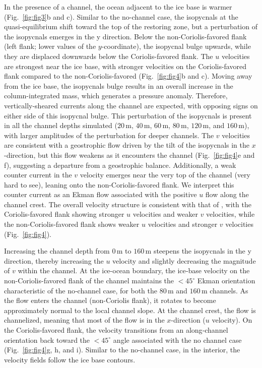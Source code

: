 \documentclass[draft]{agujournal2019}
\begin{document}
In the presence of a channel, the ocean adjacent to the ice base is warmer (Fig.~\ref{fig:fig3}b and c). Similar to the no-channel case, the isopycnals at the quasi-equilibrium shift toward the top of the restoring zone, but a perturbation of the isopycnals emerges in the y direction. Below the non-Coriolis-favored flank (left flank; lower values of the $y$-coordinate), the isopycnal bulge upwards, while they are displaced downwards below the Coriolis-favored flank. The $u$ velocities are strongest near the ice base, with stronger velocities on the Coriolis-favored flank compared to the non-Coriolis-favored (Fig.~\ref{fig:fig4}b and c). Moving away from the ice base, the isopycnals bulge results in an overall increase in the column-integrated mass, which generates a pressure anomaly. Therefore, vertically-sheared currents along the channel are expected, with opposing signs on either side of this isopycnal bulge. This perturbation of the isopycnals is present in all the channel depths simulated ($20\,\mathrm{m}$, $40\,\mathrm{m}$, $60\,\mathrm{m}$, $80\,\mathrm{m}$, $120\,\mathrm{m}$, and $160\,\mathrm{m}$), with larger amplitudes of the perturbation for deeper channels.
The $v$ velocities are consistent with a geostrophic flow driven by the tilt of the isopycnals in the $x$-direction, but this flow weakens as it encounters the channel (Fig.~\ref{fig:fig4}e and f), suggesting a departure from a geostrophic balance. Additionally, a weak counter current in the $v$ velocity emerges near the very top of the channel (very hard to see), leaning onto the non-Coriolis-favored flank. We interpret this counter current as an Ekman flow associated with the positive $u$ flow along the channel crest.
The overall velocity structure is consistent with that of \citet{Cheng_Channel_2024}, with the Coriolis-favored flank showing stronger $u$ velocities and weaker $v$ velocities, while the non-Coriolis-favored flank shows weaker $u$ velocities and stronger $v$ velocities (Fig.~\ref{fig:fig4}). 

Increasing the channel depth from $0\,\mathrm{m}$ to $160\,\mathrm{m}$ steepens the isopycnals in the y direction, thereby increasing the $u$ velocity and slightly decreasing the magnitude of $v$ within the channel. At the ice-ocean boundary, the ice‑base velocity on the non-Coriolis-favored flank of the channel maintains the $< 45^\circ$ Ekman orientation characteristic of the no‑channel case, for both the $80\,\mathrm{m}$ and $160\,\mathrm{m}$ channels. As the flow enters the channel (non-Coriolis flank), it rotates to become approximately normal to the local channel slope. At the channel crest, the flow is channelized, meaning that most of the flow is in the $x$-direction ($u$ velocity). On the Coriolis-favored flank, the velocity transitions from an along‑channel orientation back toward the $< 45^\circ$ angle associated with the no channel case (Fig.~\ref{fig:fig4}g, h, and i). Similar to the no-channel case, in the interior, the velocity fields follow the ice base contours. 
\end{document}
